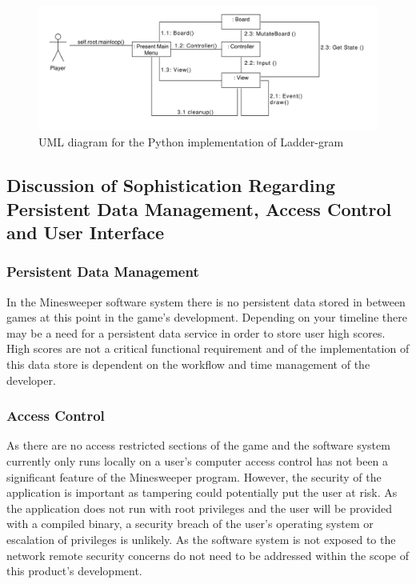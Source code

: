 \documentclass[12pt, a4]{report}
\begin{document}
\begin{figure}[!h]
	\centering
	\includegraphics[scale=0.6]{CollaborationDiagram}
	\caption{UML diagram for the Python implementation of Ladder-gram}
\end{figure}


\subsection{Discussion of Sophistication Regarding Persistent Data Management, Access Control and User Interface}
\subsubsection{Persistent Data Management}
In the Minesweeper software system there is no persistent data stored in between games at this point in the game's development. Depending on your timeline there may be a need for a persistent data service in order to store user high scores. High scores are not a critical functional requirement and of the implementation of this data store is dependent on the workflow and time management of the developer.

\subsubsection{Access Control}
As there are no access restricted sections of the game and the software system currently only runs locally on a user's computer access control has not been a significant feature of the Minesweeper program. However, the security of the application is important as tampering could potentially put the user at risk. As the application does not run with root privileges and the user will be provided with a compiled binary, a security breach of the user's operating system or escalation of privileges is unlikely. As the software system is not exposed to the network remote security concerns do not need to be addressed within the scope of this product's development.
\end{document}
